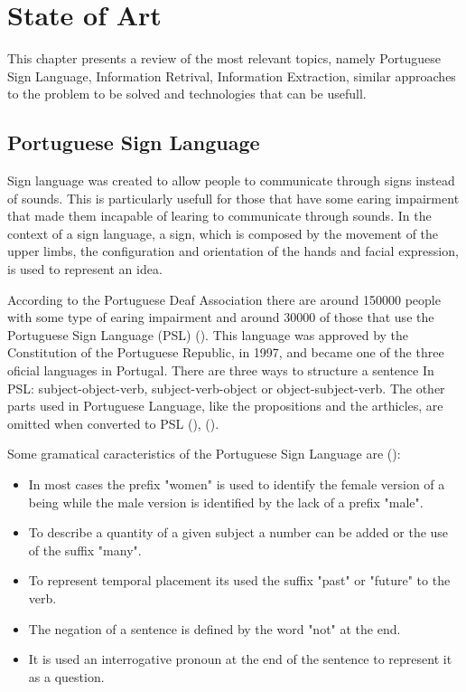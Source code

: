 
\chapter{State of Art}
\label{chap:Chapter2}

This chapter presents a review of the most relevant topics, namely Portuguese Sign Language, Information Retrival, Information Extraction, similar approaches to the problem to be solved and technologies that can be usefull.

\section{Portuguese Sign Language}

Sign language was created to allow people to communicate through signs instead of sounds.
This is particularly usefull for those that have some earing impairment that made them incapable of learing to communicate through sounds.
In the context of a sign language, a sign, which is composed by the movement of the upper limbs, the configuration and orientation of the hands and facial expression, is used to represent an idea.
    
According to the Portuguese Deaf Association there are around 150000 people with some type of earing impairment and around 30000 of those that use the Portuguese Sign Language (PSL) (\cite{gaspar_2015}).
This language was approved by the Constitution of the Portuguese Republic, in 1997, and became one of the three oficial languages in Portugal.
There are three ways to structure a sentence In PSL: subject-object-verb, subject-verb-object or object-subject-verb.
The other parts used in Portuguese Language, like the propositions and the arthicles, are omitted when converted to PSL (\cite{bento_2013}), (\cite{martins_2011}).

Some gramatical caracteristics of the Portuguese Sign Language are (\cite{bento_2013}):

\begin{itemize}
    \item In most cases the prefix "women" is used to identify the female version of a being while the male version is identified by the lack of a prefix "male".
    \item To describe a quantity of a given subject a number can be added or the use of the suffix "many".
    \item To represent temporal placement its used the suffix "past" or "future" to the verb.
    \item The negation of a sentence is defined by the word "not" at the end.
    \item It is used an interrogative pronoun at the end of the sentence to represent it as a question.
\end{itemize}

